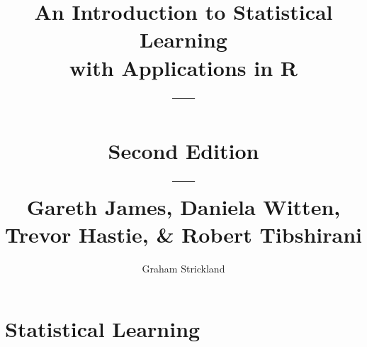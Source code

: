 \documentclass{article}
\title{
    An Introduction to Statistical Learning\\with Applications in R\\---\\
    \\Second Edition\\---\\Gareth James, Daniela Witten, Trevor Hastie, 
    \& Robert Tibshirani
}
\author{Graham Strickland}
\begin{document}
\maketitle  

\section{Statistical Learning}

\end{document}

